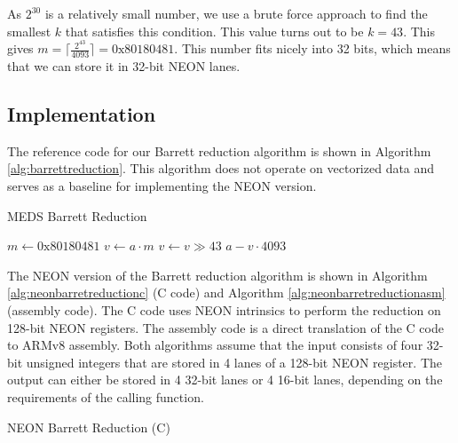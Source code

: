 \documentclass[11pt,a4paper]{report}
\theoremstyle{definition}
\begin{document}
As $2^{30}$ is a relatively small number, we use a brute force approach to find the smallest $k$ that satisfies this condition. This value turns out to be $k = 43$. This gives $m = \lceil \frac{2^{43}}{4093} \rceil = 0\text{x}80180481$. This number fits nicely into 32 bits, which means that we can store it in 32-bit NEON lanes.

\subsection{Implementation}
The reference code for our Barrett reduction algorithm is shown in Algorithm \ref{alg:barrettreduction}. This algorithm does not operate on vectorized data and serves as a baseline for implementing the NEON version.

\begin{algorithm}
  \caption{MEDS Barrett Reduction}
  \label{alg:barrettreduction}
  \begin{algorithmic}
      \State $m \gets 0\text{x}80180481$
      \State $v \gets a \cdot m$
      \State $v \gets v \gg 43$
      \State \Return $a - v \cdot 4093$
    \EndFunction
  \end{algorithmic}
\end{algorithm}

The NEON version of the Barrett reduction algorithm is shown in Algorithm \ref{alg:neonbarretreductionc} (C code) and Algorithm \ref{alg:neonbarretreductionasm} (assembly code). The C code uses NEON intrinsics to perform the reduction on 128-bit NEON registers. The assembly code is a direct translation of the C code to ARMv8 assembly. Both algorithms assume that the input consists of four 32-bit unsigned integers that are stored in 4 lanes of a 128-bit NEON register. The output can either be stored in 4 32-bit lanes or 4 16-bit lanes, depending on the requirements of the calling function.

\begin{algorithm}
  \caption{NEON Barrett Reduction (C)}
  \label{alg:neonbarretreductionc}
  
\end{algorithm}

\begin{algorithm}
  \caption{NEON Barrett Reduction (Assembly)}
  \label{alg:neonbarretreductionasm}
  Assembler}, style=ASMStyle]{code/barrett_reduce_asm.s}
\end{algorithm}
\end{document}
